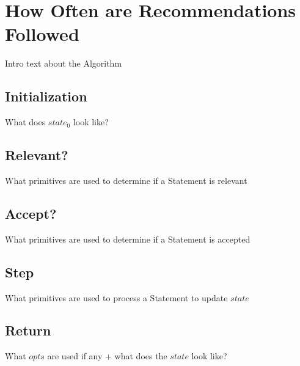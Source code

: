 \documentclass[../main.tex]{subfiles}
\begin{document}
\section{How Often are Recommendations Followed}
Intro text about the Algorithm
\subsection{Initialization}
What does $state_{0}$ look like?
\subsection{Relevant?}
What primitives are used to determine if a Statement is relevant
\subsection{Accept?}
What primitives are used to determine if a Statement is accepted
\subsection{Step}
What primitives are used to process a Statement to update $state$
\subsection{Return}
What $opts$ are used if any + what does the $state$ look like?
\end{document}
